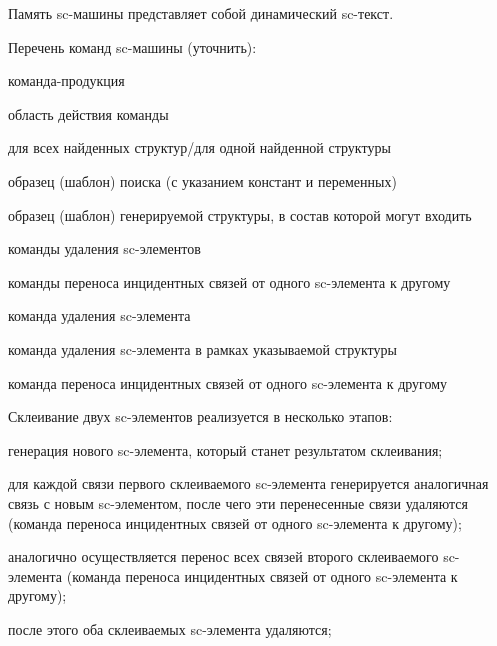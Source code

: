 Память sc-машины представляет собой динамический sc-текст. %

Перечень команд sc-машины (уточнить):
\begin{textitemize}
	\item команда-продукция
	\begin{textitemize}
		\item область действия команды
		\item для всех найденных структур/для одной найденной структуры
		\item образец (шаблон) поиска (с указанием констант и переменных)
		\item образец (шаблон) генерируемой структуры, в состав которой могут входить
		\begin{textitemize}
			\item команды удаления sc-элементов
			\item команды переноса инцидентных связей от одного sc-элемента к другому
		\end{textitemize}
	\end{textitemize}
	\item команда удаления sc-элемента
	\item команда удаления sc-элемента в рамках указываемой структуры %
	\item команда переноса инцидентных связей от одного sc-элемента к другому
\end{textitemize}

Склеивание двух sc-элементов реализуется в несколько этапов:
\begin{textitemize}
	\item генерация нового sc-элемента, который станет результатом склеивания;
	\item для каждой связи первого склеиваемого sc-элемента генерируется аналогичная связь с новым sc-элементом, после чего эти перенесенные связи удаляются (команда переноса инцидентных связей от одного sc-элемента к другому);
	\item аналогично осуществляется перенос всех связей второго склеиваемого sc-элемента (команда переноса инцидентных связей от одного sc-элемента к другому); %
	\item после этого оба склеиваемых sc-элемента удаляются;
\end{textitemize}

